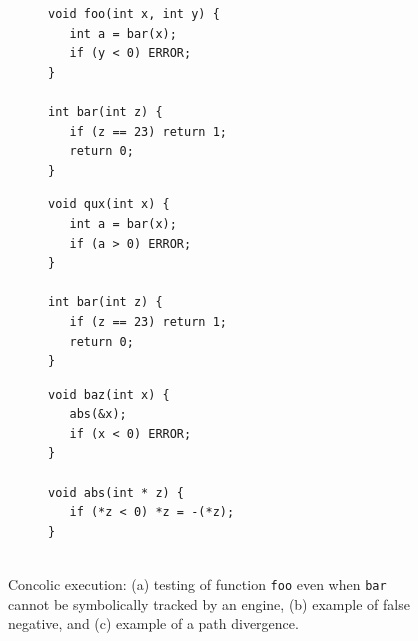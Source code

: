 \begin{figure}[t]
  \begin{subfigure}[t]{.33\textwidth}
    \begin{lstlisting}[basicstyle=\ttfamily\scriptsize]
void foo(int x, int y) {
   int a = bar(x);
   if (y < 0) ERROR;
} 

int bar(int z) {
   if (z == 23) return 1;
   return 0;
}
    \end{lstlisting}
    \vspace{-4mm}
    \caption{}
  \end{subfigure}%
  \begin{subfigure}[t]{.33\textwidth}
    \begin{lstlisting}[basicstyle=\ttfamily\scriptsize]
void qux(int x) {
   int a = bar(x);
   if (a > 0) ERROR;
} 

int bar(int z) {
   if (z == 23) return 1;
   return 0;
}
    \end{lstlisting}
    \vspace{-4mm}
    \caption{}
  \end{subfigure}%
  \begin{subfigure}[t]{.33\textwidth}
    \begin{lstlisting}[basicstyle=\ttfamily\scriptsize]
void baz(int x) {
   abs(&x);
   if (x < 0) ERROR;
} 

void abs(int * z) {
   if (*z < 0) *z = -(*z);
}
  
    \end{lstlisting}
    \vspace{-1mm}
    \caption{}
  \end{subfigure}%

  \vspace{-2mm}
  \caption{Concolic execution: (a) testing of function {\tt foo} even when {\tt bar} cannot be symbolically tracked by an engine, (b) example of false negative, and (c) example of a path divergence.
   }
  \label{fig:example-concolic-problems}
  \vspace{-3mm}
\end{figure}

